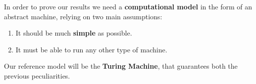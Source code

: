 In order to prove our results we need a \textbf{computational model} in the form of an abstract machine, relying on two main assumptions:
\begin{enumerate}
    \item It should be much \textbf{simple} as possible.
    \item It must be able to run any other type of machine.
\end{enumerate}
Our reference model will be the \textbf{Turing Machine}, that guarantees both the previous peculiarities.